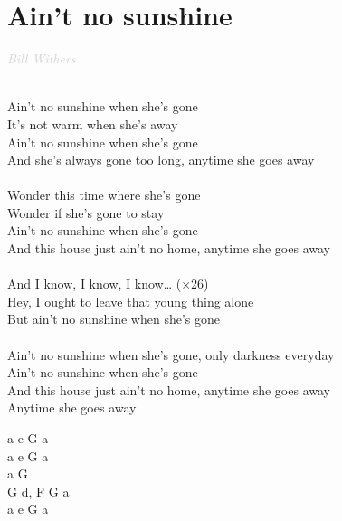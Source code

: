 \documentclass[a5paper, 10pt]{book}
\begin{document}
\section{Ain't no sunshine}\textcolor{lightgray}{\textit{Bill Withers}}\\~\\
\begin{minipage}[t]{0.8\textwidth}
  Ain't no sunshine when she's gone\\
  It's not warm when she's away\\
  Ain't no sunshine when she's gone\\
  And she's always gone too long, anytime she goes away\\
  \\
  Wonder this time where she's gone\\
  Wonder if she's gone to stay\\
  Ain't no sunshine when she's gone\\
  And this house just ain't no home, anytime she goes away\\
  \\
  \hspace*{5mm}And I know, I know, I know… ($\times$26)\\
  \hspace*{5mm}Hey, I ought to leave that young thing alone\\
  \hspace*{5mm}But ain't no sunshine when she's gone\\
  \\
  Ain't no sunshine when she's gone, only darkness everyday\\
  Ain't no sunshine when she's gone\\
  And this house just ain't no home, anytime she goes away\\
  Anytime she goes away
\end{minipage}
\begin{minipage}[t]{0.2\textwidth}
  a e G  a\\
  a e G  a\\
  a G  \\
  G d, F G a\\
  a e G  a\\

\end{minipage}

\end{document}
